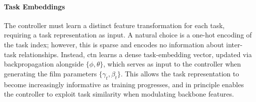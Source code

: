 \paragraph{Task Embeddings}

The controller must learn a distinct feature transformation for each task,
requiring a task representation as input. A natural choice is a one-hot encoding
of the task index; however, this is sparse and encodes no information about
inter-task relationships. Instead, \gls{ctn} learns a dense task-embedding
vector, updated via backpropagation alongside $\{\phi, \theta\}$, which serves
as input to the controller when generating the \gls{film} parameters
$\{\gamma_t, \beta_t\}$. This allows the task representation to become
increasingly informative as training progresses, and in principle enables the
controller to exploit task similarity when modulating backbone features.
